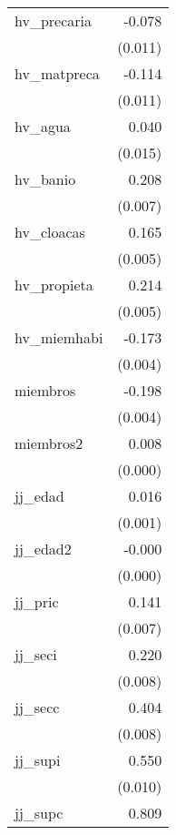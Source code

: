 {\begin{longtable}{l*{1}{D{.}{.}{-1}}}
hv\_precaria &      -0.078\sym{***}\\
            &     (0.011)         \\
\addlinespace
hv\_matpreca &      -0.114\sym{***}\\
            &     (0.011)         \\
\addlinespace
hv\_agua     &       0.040\sym{**} \\
            &     (0.015)         \\
\addlinespace
hv\_banio    &       0.208\sym{***}\\
            &     (0.007)         \\
\addlinespace
hv\_cloacas  &       0.165\sym{***}\\
            &     (0.005)         \\
\addlinespace
hv\_propieta &       0.214\sym{***}\\
            &     (0.005)         \\
\addlinespace
hv\_miemhabi &      -0.173\sym{***}\\
            &     (0.004)         \\
\addlinespace
miembros    &      -0.198\sym{***}\\
            &     (0.004)         \\
\addlinespace
miembros2   &       0.008\sym{***}\\
            &     (0.000)         \\
\addlinespace
jj\_edad     &       0.016\sym{***}\\
            &     (0.001)         \\
\addlinespace
jj\_edad2    &      -0.000\sym{***}\\
            &     (0.000)         \\
\addlinespace
jj\_pric     &       0.141\sym{***}\\
            &     (0.007)         \\
\addlinespace
jj\_seci     &       0.220\sym{***}\\
            &     (0.008)         \\
\addlinespace
jj\_secc     &       0.404\sym{***}\\
            &     (0.008)         \\
\addlinespace
jj\_supi     &       0.550\sym{***}\\
            &     (0.010)         \\
\addlinespace
jj\_supc     &       0.809\sym{***}\\

\end{longtable}}
